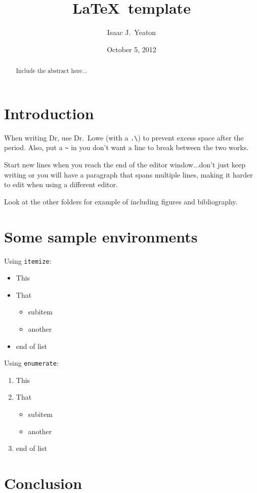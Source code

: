 \documentclass[11pt, letterpaper]{article}
\title{\LaTeX\ template}
\author{Isaac J.~Yeaton}
\date{October 5, 2012}
\begin{document}
\maketitle
\thispagestyle{empty}


\begin{abstract}
	Include the abstract here...
\end{abstract}

\tableofcontents
\listoffigures


\section{Introduction}

When writing Dr, use Dr.\ Lowe (with a \verb|.\|) to prevent excess space after the 
period.  Also, put a \verb|~| in you don't want a line to break between the two works.

Start new lines when you reach the end of the editor window...don't just keep
writing or you will have a paragraph that spans multiple lines, making it
harder to edit when using a different editor.

Look at the other folders for example of including figures and bibliography.

\section{Some sample environments}

Using \texttt{itemize}:
%
\begin{itemize}
	\item This
	\item That
	\begin{itemize}
		\item subitem
		\item another
	\end{itemize}
	\item end of list
\end{itemize}

Using \texttt{enumerate}:
%
\begin{enumerate}
	\item This
	\item That
	\begin{itemize}
		\item subitem
		\item another
	\end{itemize}
	\item end of list
\end{enumerate}


\section{Conclusion}
\end{document}
